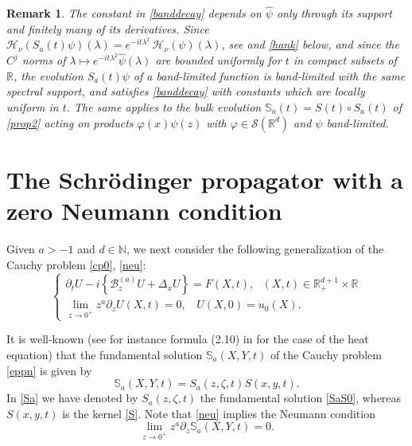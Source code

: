 \documentclass[11pt,letter]{amsart}
\def \R {\mathbb{R}}
\def \vf{\varphi}
\newcommand{\Rd}{\mathbb R^d}
\newcommand{\p}{\partial}
\newcommand{\la}{\lambda}
\numberwithin{equation}{section}
\newtheorem{remark}[theorem]{Remark}
\numberwithin{equation}{section}
\begin{document}
\begin{remark}\label{R:bandt}
The constant in \eqref{banddecay} depends on $\hat\psi$ only through its support and finitely many of its derivatives. Since $\mathcal H_\nu\left(S_a(t)\psi\right)(\la) = e^{-it\la^2}\, \mathcal H_\nu(\psi)(\la)$, see \cite{GS} and \eqref{hank} below, and since the $C^{j}$ norms of $\la \mapsto e^{-it\la^2}\hat\psi(\la)$ are bounded uniformly for $t$ in compact subsets of $\R$, the evolution $S_a(t)\psi$ of a band-limited function is band-limited with the same spectral support, and satisfies \eqref{banddecay} with constants which are locally uniform in $t$. The same applies to the bulk evolution $\mathbb S_a(t) = S(t)\circ S_a(t)$ of \eqref{prop2} acting on products $\vf(x)\psi(z)$ with $\vf\in \mathscr S(\Rd)$ and $\psi$ band-limited.
\end{remark}





\vskip 0.3in

\section{The Schr\"odinger propagator with a zero Neumann condition}\label{S:propa}

Given $a>-1$ and $d\in \mathbb N$, we next consider the following generalization of the Cauchy problem \eqref{cp0}, \eqref{neu}:
\begin{equation}\label{eppn}
\begin{cases}
\p_t U - i \left\{\mathscr B_z^{(a)} U +  \Delta_x U\right\} = F(X,t),\ \ \ (X,t)\in \R_+^{d+1}\times \R
\\
\underset{z\to 0^+}{\lim} z^a \p_z U(X,t) = 0,\ \  \ \ U(X,0) = u_0(X).
\end{cases}
\end{equation}


It is well-known (see for instance formula (2.10) in \cite{BDGP} for the case of the heat equation) that the fundamental solution $\mathbb S_a(X,Y,t)$ of the Cauchy problem \eqref{eppn} is given by  
\begin{equation}\label{Sa}
\mathbb S_a(X,Y,t) =  S_a(z,\zeta,t) S(x,y,t).
\end{equation}
In \eqref{Sa} we have denoted by $S_a(z,\zeta,t)$ the fundamental solution \eqref{SaS0}, whereas $S(x,y,t)$ is the kernel \eqref{S}.
Note that \eqref{neu} implies the Neumann condition
\begin{equation}\label{Sazeron}
\underset{z\to 0^+}{\lim} z^a \p_z \mathbb S_a(X,Y,t) = 0.
\end{equation}
\end{document}
